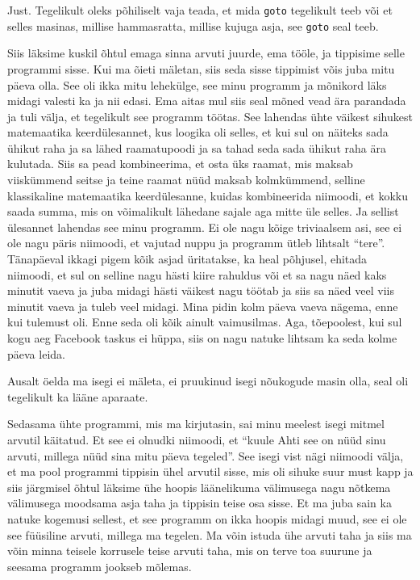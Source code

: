 
Just. Tegelikult oleks põhiliselt vaja teada, et mida \verb|goto| tegelikult teeb 
või et selles masinas, millise hammasratta, millise kujuga asja, see 
\verb|goto| seal teeb.


Siis läksime kuskil õhtul emaga  sinna arvuti juurde, ema tööle, ja  
tippisime selle programmi sisse. Kui ma õieti mäletan, siis seda sisse 
tippimist võis juba mitu päeva olla. See oli ikka mitu lehekülge, see minu 
programm ja mõnikord läks midagi valesti ka ja nii edasi. Ema aitas mul siis 
seal mõned vead ära parandada ja  tuli välja, et  tegelikult see programm 
töötas. See lahendas ühte väikest sihukest matemaatika  keerdülesannet, kus  
loogika oli  selles, et kui sul on  näiteks sada ühikut raha ja sa lähed 
raamatupoodi ja sa tahad seda sada ühikut raha ära kulutada. Siis sa pead 
kombineerima, et osta üks raamat, mis maksab viiskümmend seitse ja teine raamat 
nüüd maksab kolmkümmend, selline klassikaline  matemaatika keerdülesanne, 
kuidas kombineerida niimoodi, et kokku saada  summa, mis on võimalikult 
lähedane sajale aga mitte üle selles. Ja sellist ülesannet lahendas see minu 
programm. Ei ole nagu kõige triviaalsem asi, see ei ole nagu päris niimoodi, et 
vajutad nuppu ja programm ütleb lihtsalt \enquote{tere}. Tänapäeval ikkagi 
pigem kõik asjad üritatakse, ka heal põhjusel, ehitada niimoodi, et sul on 
selline nagu hästi kiire rahuldus või et sa nagu näed kaks minutit vaeva ja 
juba midagi hästi väikest nagu töötab ja siis sa näed veel viis minutit vaeva 
ja tuleb veel midagi. Mina pidin kolm päeva vaeva nägema, enne 
kui tulemust oli. Enne seda oli kõik ainult vaimusilmas.  Aga, tõepoolest, kui 
sul kogu aeg Facebook taskus ei hüppa, siis on nagu natuke lihtsam ka seda kolme 
päeva leida. 


Ausalt öelda ma isegi ei mäleta, ei pruukinud isegi nõukogude masin olla,  seal 
oli tegelikult ka lääne aparaate.

Sedasama ühte programmi, mis ma kirjutasin, sai minu meelest 
 isegi  mitmel arvutil käitatud. Et see ei olnudki niimoodi, et 
\enquote{kuule Ahti see on nüüd sinu arvuti, millega nüüd sina  mitu päeva 
tegeled}. See isegi vist nägi niimoodi välja, et ma pool programmi 
tippisin ühel arvutil sisse, mis oli sihuke suur must kapp ja siis järgmisel 
õhtul läksime ühe hoopis  läänelikuma välimusega  nagu nõtkema 
välimusega moodsama asja taha ja tippisin teise osa sisse. Et ma juba sain ka 
natuke kogemusi sellest, et see programm on ikka hoopis midagi muud, see ei ole 
see füüsiline arvuti, millega ma tegelen. Ma võin istuda ühe arvuti taha ja 
siis ma võin minna teisele korrusele teise arvuti taha, mis on terve toa suurune 
ja seesama programm jookseb mõlemas.

